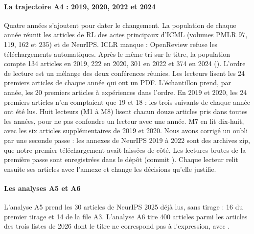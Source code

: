 \paragraph{La trajectoire A4 : 2019, 2020, 2022 et 2024}
Quatre années s'ajoutent pour dater le changement. La population de chaque année réunit les articles de RL des actes principaux d'ICML
(volumes PMLR 97, 119, 162 et 235) et de NeurIPS. ICLR manque : OpenReview refuse les téléchargements
automatiques. Après le même tri sur le titre, la population compte 134 articles en 2019, 222
en 2020, 301 en 2022 et 374 en 2024 (). L'ordre de lecture est un
mélange  des deux conférences réunies. Les lecteurs lisent les 24 premiers
articles de chaque année qui ont un PDF. L'échantillon prend, par année, les 20 premiers articles
 à expériences dans l'ordre. En 2019 et 2020, les 24 premiers articles n'en comptaient
que 19 et 18 : les trois suivants de chaque année ont été lus. Huit lecteurs (M1 à M8)
lisent chacun douze articles pris dans toutes les années, pour ne pas confondre un lecteur avec une
année. M7 en lit dix-huit, avec les six articles supplémentaires de 2019 et 2020. Nous avons corrigé
un oubli par une seconde passe : les annexes de NeurIPS 2019 à 2022 sont des archives zip, que notre
premier téléchargement avait laissées de côté. Les lectures brutes de la première passe sont enregistrées dans
le dépôt (commit ). Chaque lecteur relit ensuite ses articles avec l'annexe et change
les décisions qu'elle justifie.

\paragraph{Les analyses A5 et A6}
L'analyse A5 prend les 30 articles de NeurIPS 2025 déjà lus, sans tirage : 16 du premier
tirage et 14 de la file A3. L'analyse A6 tire 400 articles parmi les articles des trois
listes de 2026 dont le titre ne correspond pas à l'expression, avec .

